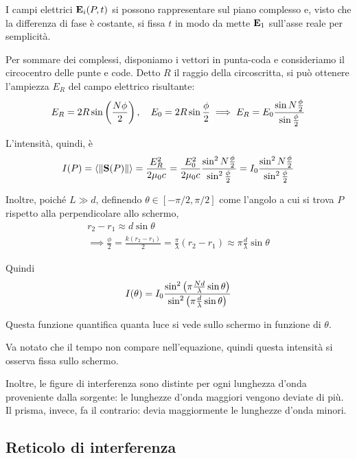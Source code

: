 
I campi elettrici $\mathbf{E}_i(P, t)$ si possono rappresentare sul piano complesso e, visto che la differenza di fase è costante, si fissa $t$ in modo da mette $\mathbf{E}_1$ sull'asse reale per semplicità.

Per sommare dei complessi, disponiamo i vettori in punta-coda e consideriamo il circocentro delle punte e code.
Detto $R$ il raggio della circoscritta, si può ottenere l'ampiezza $E_R$ del campo elettrico risultante:
\begin{equation}
    E_R = 2 R \sin\left( \frac{N \phi}{2} \right), \quad E_0 = 2 R \sin\frac{\phi}{2}
    \implies E_R = E_0 \frac{\sin N \frac{\phi}{2}}{\sin \frac{\phi}{2}}
\end{equation}

L'intensità, quindi, è
\begin{equation}
    I(P) = \left\langle \left\lVert \mathbf{S}(P) \right\rVert \right\rangle = \frac{E_R^2}{2 \mu_0 c} = \frac{E_0^2}{2 \mu_0 c} \frac{\sin^2 N\frac{\phi}{2}}{\sin^2 \frac{\phi}{2}} = I_0 \frac{\sin^2 N\frac{\phi}{2}}{\sin^2 \frac{\phi}{2}}
\end{equation}

Inoltre, poiché $L \gg d$, definendo $\theta \in [-\pi / 2, \pi / 2]$ come l'angolo a cui si trova $P$ rispetto alla perpendicolare allo schermo,
\begin{gather}
    r_2 - r_1 \approx d \sin \theta \\
    \implies \frac{\phi}{2} = \frac{k (r_2 - r_1)}{2} = \frac{\pi}{\lambda} (r_2 - r_1) \approx \pi \frac{d}{\lambda} \sin \theta
\end{gather}

Quindi
\begin{equation}
\label{eq:reticolo}
    I(\theta) = I_0 \frac{\sin^2 \left( \pi \frac{N d}{\lambda} \sin \theta \right)}{\sin^2 \left( \pi \frac{d}{\lambda} \sin \theta \right)}
\end{equation}

Questa funzione quantifica quanta luce si vede sullo schermo in funzione di $\theta$.

Va notato che il tempo non compare nell'equazione, quindi questa intensità si osserva fissa sullo schermo.

Inoltre, le figure di interferenza sono distinte per ogni lunghezza d'onda proveniente dalla sorgente: le lunghezze d'onda maggiori vengono deviate di più.
Il prisma, invece, fa il contrario: devia maggiormente le lunghezze d'onda minori.

\subsection{Reticolo di interferenza}

